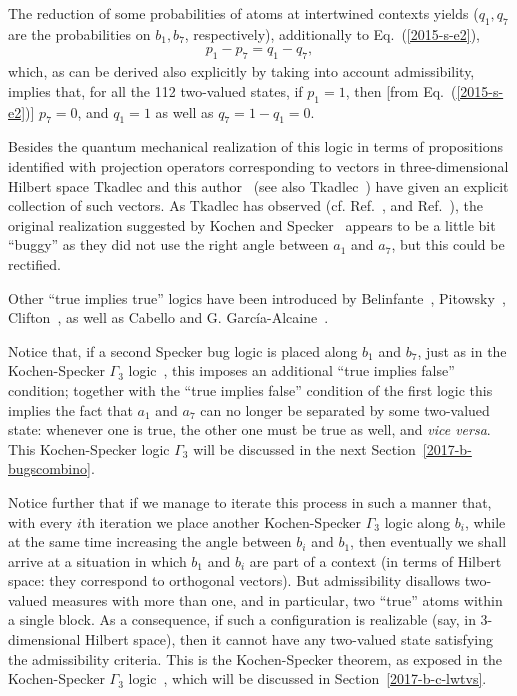 The reduction of some probabilities of atoms at intertwined contexts yields ($q_1, q_7$ are the probabilities on $b_1, b_7$, respectively),
additionally to Eq.~(\ref{2015-s-e2}),
\begin{equation}
\begin{split}
p_1 - p_7 = q_1 - q_7
,
\end{split}
\label{2017-b-spa2l}
\end{equation}
which, as  can  be derived also explicitly by taking into account admissibility,
implies that, for all the 112 two-valued states, if $p_1=1$, then [from Eq.~(\ref{2015-s-e2})] $p_7=0$,
and $q_1=1$ as well as $q_7 = 1 - q_1 = 0$.

Besides the  quantum mechanical realization of this logic in terms of propositions identified with projection operators
corresponding to vectors in three-dimensional Hilbert space
Tkadlec and this author~\cite[p.~5387, Fig.~4]{svozil-tkadlec}
(see also Tkadlec~\cite[p.~206, Fig.~1]{tkadlec-96}) have given  an explicit collection of such vectors.
As Tkadlec has observed (cf. Ref.~\cite[p.~5390]{svozil-tkadlec}, and Ref.~\cite[p.]{tkadlec-01}),
the original realization suggested by Kochen and Specker~\cite{kochen1} appears to be a little bit ``buggy''
as they did not use the right angle between $a_1$ and $a_7$, but this could be rectified.

Other ``true implies true'' logics have been introduced by Belinfante~\cite[Fig.~C.l. p.~67]{Belinfante-73},
Pitowsky~\cite[p.~394]{Pitowsky-1982-subs},
Clifton~\cite{clifton-93,Johansen-1994,Vermaas-1994},
as well as Cabello and G. Garc{\'{i}}a-Alcaine~\cite[Lemma~1]{Cabello-1996-bks-fd}.


Notice that, if a second Specker bug logic is placed along $b_1$ and $b_7$,
just as in the Kochen-Specker $\Gamma_3$ logic~\cite[p.~70]{kochen1},
this imposes an additional ``true implies false'' condition; together with the
 ``true implies false'' condition of the first logic this
implies the fact that $a_1$ and $a_7$ can no longer be separated by some two-valued state: whenever one is true,
the other one must be true as well, and {\em vice versa}.
This Kochen-Specker logic $\Gamma_3$ will be discussed in the next Section~\ref{2017-b-bugscombino}.

Notice further that if we manage to iterate this process in such a manner that,
with every $i$th iteration we place another Kochen-Specker $\Gamma_3$ logic  along $b_i$,
while at the same time increasing the angle between $b_i$ and $b_1$,
then eventually we shall arrive at a situation in which $b_1$ and $b_i$ are part of a context
(in terms of Hilbert space: they correspond to orthogonal vectors).
But admissibility disallows two-valued measures with more than one, and in particular,
two ``true'' atoms within a single block. As a consequence, if such a configuration is
realizable (say, in 3-dimensional Hilbert space), then it cannot have any two-valued state
satisfying the admissibility criteria.
This is the Kochen-Specker theorem, as exposed in the  Kochen-Specker $\Gamma_3$ logic~\cite[p.~69]{kochen1},
which will be discussed in Section~\ref{2017-b-c-lwtvs}.


